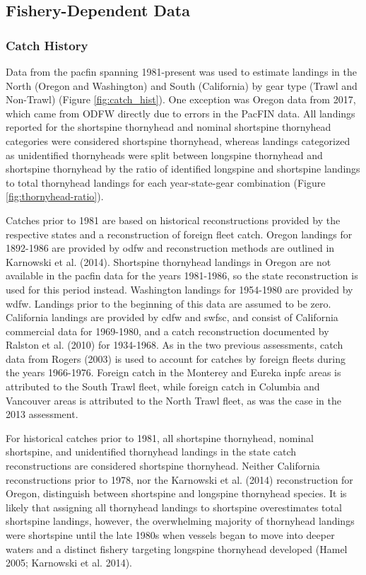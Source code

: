 \documentclass[11pt,
  letterpaper,
]{article}
\begin{document}
\hypertarget{fishery-dependent-data}{%
\subsection{Fishery-Dependent Data}\label{fishery-dependent-data}}

\hypertarget{catch-history}{%
\subsubsection{Catch History}\label{catch-history}}

Data from the \Gls{pacfin} spanning 1981-present was used to estimate landings in the North (Oregon and Washington) and South (California) by gear type (Trawl and Non-Trawl) (Figure \ref{fig:catch_hist}). One exception was Oregon data from 2017, which came from ODFW directly due to errors in the PacFIN data. All landings reported for the shortspine thornyhead and nominal shortspine thornyhead categories were considered shortspine thornyhead, whereas landings categorized as unidentified thornyheads were split between longspine thornyhead and shortspine thornyhead by the ratio of identified longspine and shortspine landings to total thornyhead landings for each year-state-gear combination (Figure \ref{fig:thornyhead-ratio}).

Catches prior to 1981 are based on historical reconstructions provided by the respective states and a reconstruction of foreign fleet catch. Oregon landings for 1892-1986 are provided by \gls{odfw} and reconstruction methods are outlined in Karnowski et al. (2014). Shortspine thornyhead landings in Oregon are not available in the \gls{pacfin} data for the years 1981-1986, so the state reconstruction is used for this period instead. Washington landings for 1954-1980 are provided by \gls{wdfw}. Landings prior to the beginning of this data are assumed to be zero. California landings are provided by \gls{cdfw} and \gls{swfsc}, and consist of California commercial data for 1969-1980, and a catch reconstruction documented by Ralston et al. (2010) for 1934-1968. As in the two previous assessments, catch data from Rogers (2003) is used to account for catches by foreign fleets during the years 1966-1976. Foreign catch in the Monterey and Eureka \gls{inpfc} areas is attributed to the South Trawl fleet, while foreign catch in Columbia and Vancouver areas is attributed to the North Trawl fleet, as was the case in the 2013 assessment.

For historical catches prior to 1981, all shortspine thornyhead, nominal shortspine, and unidentified thornyhead landings in the state catch reconstructions are considered shortspine thornyhead. Neither California reconstructions prior to 1978, nor the Karnowski et al. (2014) reconstruction for Oregon, distinguish between shortspine and longspine thornyhead species. It is likely that assigning all thornyhead landings to shortspine overestimates total shortspine landings, however, the overwhelming majority of thornyhead landings were shortspine until the late 1980s when vessels began to move into deeper waters and a distinct fishery targeting longspine thornyhead developed (Hamel 2005; Karnowski et al. 2014).
\end{document}
